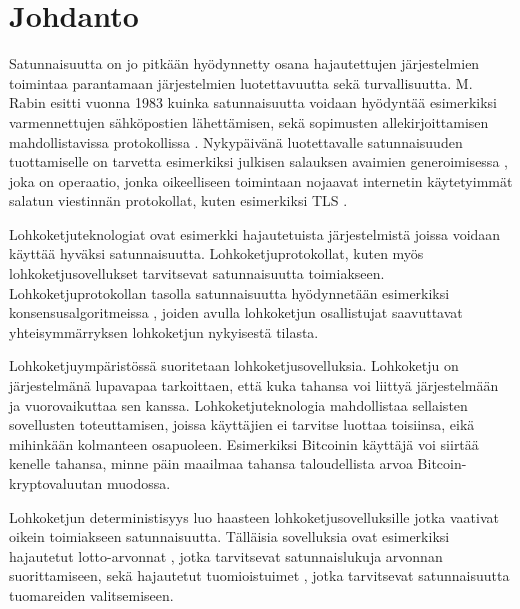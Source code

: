 \chapter{Johdanto\label{intro}}

Satunnaisuutta on jo pitkään hyödynnetty osana hajautettujen järjestelmien toimintaa parantamaan järjestelmien luotettavuutta sekä turvallisuutta. M. Rabin esitti vuonna 1983 kuinka satunnaisuutta voidaan hyödyntää esimerkiksi varmennettujen sähköpostien lähettämisen, sekä sopimusten allekirjoittamisen mahdollistavissa protokollissa \cite{rabin_transaction_1983}. Nykypäivänä luotettavalle satunnaisuuden tuottamiselle on tarvetta esimerkiksi julkisen salauksen avaimien generoimisessa \cite{corrigan-gibbs_ensuring_2014}, joka on operaatio, jonka oikeelliseen toimintaan nojaavat internetin käytetyimmät salatun viestinnän protokollat, kuten esimerkiksi TLS \cite{rescorla_transport_2018}. 

Lohkoketjuteknologiat ovat esimerkki hajautetuista järjestelmistä joissa voidaan käyttää hyväksi satunnaisuutta. Lohkoketjuprotokollat, kuten myös lohkoketjusovellukset tarvitsevat satunnaisuutta toimiakseen. Lohkoketjuprotokollan tasolla satunnaisuutta hyödynnetään esimerkiksi  konsensusalgoritmeissa \cite{gilad_algorand_2017, hanke_dfinity_2018}, joiden avulla lohkoketjun osallistujat saavuttavat yhteisymmärryksen lohkoketjun nykyisestä tilasta. 


Lohkoketjuympäristössä suoritetaan lohkoketjusovelluksia. Lohkoketju on järjestelmänä lupavapaa tarkoittaen, että kuka tahansa voi liittyä järjestelmään ja vuorovaikuttaa sen kanssa. Lohkoketjuteknologia mahdollistaa sellaisten sovellusten toteuttamisen, joissa käyttäjien ei tarvitse luottaa toisiinsa, eikä mihinkään kolmanteen osapuoleen. Esimerkiksi Bitcoinin käyttäjä voi siirtää kenelle tahansa, minne päin maailmaa tahansa taloudellista arvoa Bitcoin-kryptovaluutan muodossa.

Lohkoketjun deterministisyys luo haasteen lohkoketjusovelluksille jotka vaativat oikein toimiakseen satunnaisuutta. Tälläisia sovelluksia ovat esimerkiksi hajautetut lotto-arvonnat \cite{pooltogether_pooltogether_nodate}, jotka tarvitsevat satunnaislukuja arvonnan suorittamiseen, sekä hajautetut tuomioistuimet \cite{lesaege_kleros_2020}, jotka tarvitsevat satunnaisuutta tuomareiden valitsemiseen. 

